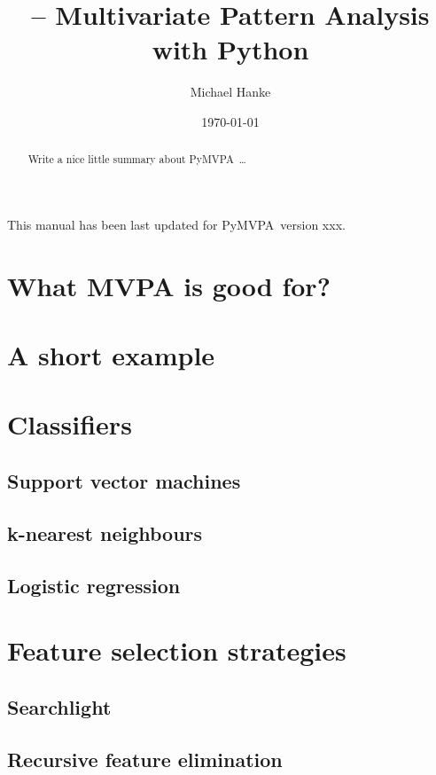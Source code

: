 \documentclass[a4paper,11pt]{scrartcl}
\author{Michael Hanke}
\title{\pymvpa -- Multivariate Pattern Analysis with Python}
\date{\today}
\newcommand{\pymvpa}{PyMVPA~}
\begin{document}
\maketitle
\begin{abstract}
Write a nice little summary about \pymvpa\ldots
\end{abstract}

\begin{center}
This manual has been last updated for \pymvpa version xxx.
\end{center}

\tableofcontents

\section{What MVPA is good for?}



\section{A short example}



\section{Classifiers}
\subsection{Support vector machines}
\subsection{k-nearest neighbours}
\subsection{Logistic regression}



\section{Feature selection strategies}
\subsection{Searchlight}
\subsection{Recursive feature elimination}
\end{document}
